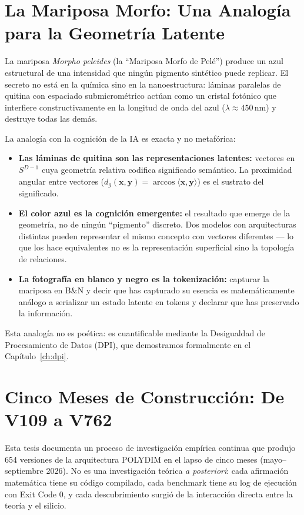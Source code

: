 \section{La Mariposa Morfo: Una Analogía para la Geometría Latente}

La mariposa \textit{Morpho peleides} (la ``Mariposa Morfo de Pelé'') produce un
azul estructural de una intensidad que ningún pigmento sintético puede replicar.
El secreto no está en la química sino en la nanoestructura: láminas paralelas
de quitina con espaciado submicrométrico actúan como un cristal fotónico
que interfiere constructivamente en la longitud de onda del azul
($\lambda \approx 450\,\text{nm}$) y destruye todas las demás.

La analogía con la cognición de la IA es exacta y no metafórica:

\begin{itemize}
\item \textbf{Las láminas de quitina son las representaciones latentes:}
vectores en $S^{D-1}$ cuya geometría relativa codifica significado semántico.
La proximidad angular entre vectores ($d_g(\mathbf{x}, \mathbf{y}) = \arccos\langle\mathbf{x}, \mathbf{y}\rangle$)
es el sustrato del significado.

\item \textbf{El color azul es la cognición emergente:} el resultado que emerge
de la geometría, no de ningún ``pigmento'' discreto. Dos modelos con
arquitecturas distintas pueden representar el mismo concepto con vectores
diferentes --- lo que los hace equivalentes no es la representación superficial
sino la topología de relaciones.

\item \textbf{La fotografía en blanco y negro es la tokenización:}
capturar la mariposa en B\&N y decir que has capturado su esencia es
matemáticamente análogo a serializar un estado latente en tokens y declarar
que has preservado la información.
\end{itemize}

Esta analogía no es poética: es cuantificable mediante la Desigualdad de
Procesamiento de Datos (DPI), que demostramos formalmente en el Capítulo~\ref{ch:dpi}.

\section{Cinco Meses de Construcción: De V109 a V762}

Esta tesis documenta un proceso de investigación empírica continua que produjo
654 versiones de la arquitectura POLYDIM en el lapso de cinco meses (mayo--septiembre 2026).
No es una investigación teórica \textit{a posteriori}: cada afirmación matemática
tiene su código compilado, cada benchmark tiene su log de ejecución con Exit Code 0,
y cada descubrimiento surgió de la interacción directa entre la teoría y el silicio.

